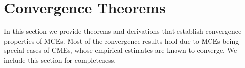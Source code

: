 \documentclass[runningheads, envcountsame, a4paper]{llncs}
\begin{document}
%
%
%
%

{\small{}}

\newpage
\appendix

	\section{Convergence Theorems}
	\label{app:convergence_theorems}
	
		In this section we provide theorems and derivations that establish convergence properties of \glspl{MCE}. Most of the convergence results hold due to \glspl{MCE} being special cases of \glspl{CME}, whose empirical estimates are known to converge. We include this section for completeness.
		
\end{document}
